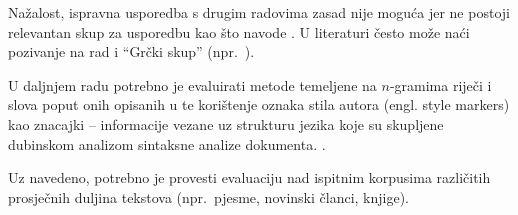 \documentclass{article}
\begin{document}
Nažalost, ispravna usporedba s drugim radovima zasad nije moguća jer ne postoji
relevantan skup za usporedbu kao što navode \citep{zhao2005effective}. U
literaturi često može naći pozivanje na rad \citep{stamatatos2001computer} i
``Grčki skup'' (npr.~\citep{keselj2003n}).

U daljnjem radu potrebno je evaluirati metode temeljene na $n$-gramima riječi i
slova poput onih opisanih u
\citep{keselj2003n,peng2003language,coyotl2006authorship} te korištenje oznaka
stila autora (engl. style markers) kao znacajki – informacije vezane uz strukturu
jezika koje su skupljene dubinskom analizom sintaksne analize dokumenta.
\citep{stamatatos2001computer,diri2003automatic,luyckx2005shallow}.

Uz navedeno, potrebno je provesti evaluaciju nad ispitnim korpusima različitih
prosječnih duljina tekstova (npr.~pjesme, novinski članci, knjige).





\newpage

\appendix
\end{document}

